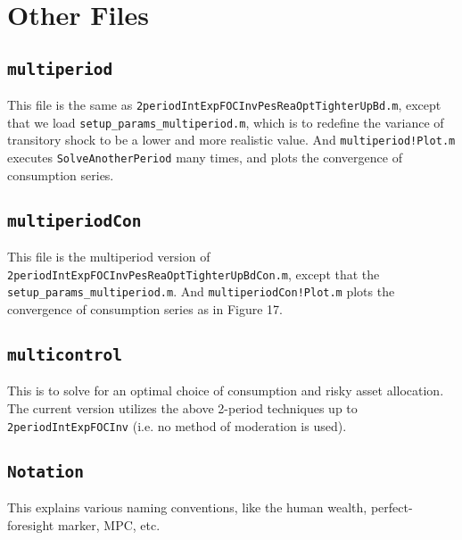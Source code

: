 \documentclass[titlepage,abstract]{\econtex}
\begin{document}
\section{Other Files}

\subsection{\texttt{multiperiod}}
This file is the same as \texttt{2periodIntExpFOCInvPesReaOptTighterUpBd.m}, except that we load \texttt{setup\_params\_multiperiod.m}, which is to redefine the variance of transitory shock to be a lower and more realistic value. And \texttt{multiperiod!Plot.m} executes \texttt{SolveAnotherPeriod} many times, and plots the convergence of consumption series.

\subsection{\texttt{multiperiodCon}}
This file is the multiperiod version of \texttt{2periodIntExpFOCInvPesReaOptTighterUpBdCon.m}, except that the \texttt{setup\_params\_multiperiod.m}. And \texttt{multiperiodCon!Plot.m} plots the convergence of consumption series as in Figure 17.

\subsection{\texttt{multicontrol}}
This is to solve for an optimal choice of consumption and risky asset allocation. The current version utilizes the above 2-period techniques up to \texttt{2periodIntExpFOCInv} (i.e. no method of moderation is used).

\subsection{\texttt{Notation}}
This explains various naming conventions, like the human wealth, perfect-foresight marker, MPC, etc.

%
%
%
\end{document}
